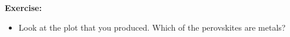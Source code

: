 \begin{tcolorbox}
\textbf{Exercise:}
\begin{itemize}
\item Look at the plot that you produced. Which of the perovskites are metals?
\end{itemize}
\end{tcolorbox}





%

